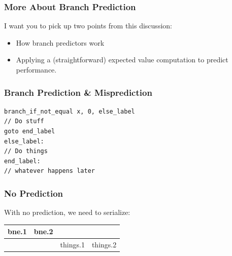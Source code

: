 \begin{frame}
\frametitle{More About Branch Prediction}

I want you to pick up two points from this discussion:

\begin{itemize}
\item How branch predictors work
\item Applying a (straightforward) expected value computation to predict performance.
\end{itemize}



\end{frame}


\begin{frame}[fragile]
\frametitle{Branch Prediction \& Misprediction}

\hspace*{2em} \begin{minipage}{.4\textwidth} \begin{lstlisting}
branch_if_not_equal x, 0, else_label
// Do stuff
goto end_label
else_label:
// Do things
end_label:
// whatever happens later
\end{lstlisting}
\end{minipage}

\end{frame}



\begin{frame}
\frametitle{No Prediction}

With no prediction, we need to serialize:

\begin{center}
\begin{tabular}{c|c|c|c}
bne.1 & bne.2 \\ \hline
& & things.1 & things.2
\end{tabular}
\end{center}

\end{frame}



